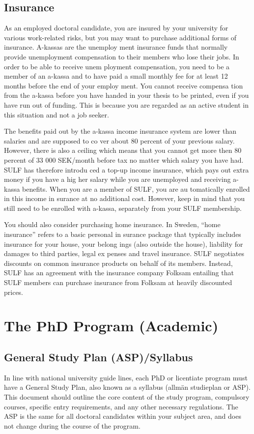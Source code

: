 \documentclass{article}
\begin{document}
\subsection{Insurance}
As an employed doctoral candidate,
you are insured by your university for
various work-related risks, but you may
want to purchase additional forms of
insurance. A-kassas are the unemploy
ment insurance funds that normally
provide unemployment compensation
to their members who lose their jobs.
In order to be able to receive unem
ployment compensation, you need to
be a member of an a-kassa and to have
paid a small monthly fee for at least 12
months before the end of your employ
ment. You cannot receive compensa
tion from the a-kassa before you have
handed in your thesis to be printed,
even if you have run out of funding.
This is because you are regarded as an
active student in this situation and not
a job seeker.

The benefits paid out by the a-kassa
income insurance system are lower
than salaries and are supposed to co
ver about 80 percent of your previous
salary. However, there is also a ceiling
which means that you cannot get more
then 80 percent of 33 000 SEK/month
before tax no matter which salary you
have had. SULF has therefore introdu
ced a top-up income insurance, which
pays out extra money if you have a hig
her salary while you are unemployed
and receiving a-kassa benefits. When
you are a member of SULF, you are au
tomatically enrolled in this income in
surance at no additional cost. However,
keep in mind that you still need to be
enrolled with a-kassa, separately from
your SULF membership.

You should also consider purchasing
home insurance. In Sweden, “home
insurance” refers to a basic personal in
surance package that typically includes
insurance for your house, your belong
ings (also outside the house), liability
for damages to third parties, legal ex
penses and travel insurance.
SULF negotiates discounts on common
insurance products on behalf of its members. Instead, SULF has an agreement with the insurance company Folksam entailing
that SULF members can purchase insurance from Folksam at heavily discounted prices.

\section{The PhD Program (Academic)}

\subsection{General Study Plan (ASP)/Syllabus}
In line with national university guide lines, each PhD or licentiate program
must have a General Study Plan, also known as a syllabus (allmän studieplan or ASP). This document should outline
the core content of the study program, compulsory courses, specific entry requirements, and any other necessary
regulations. The ASP is the same for all doctoral candidates within your subject area,
and does not change during the course of the program.
\end{document}
